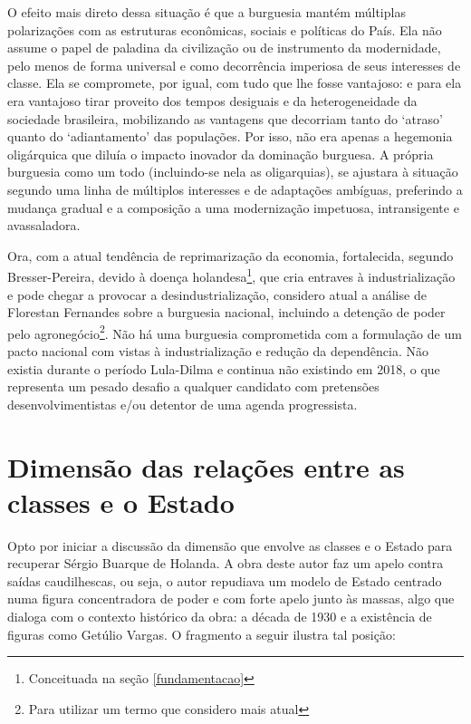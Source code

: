 	\begin{citacao}
		O efeito mais direto dessa situação é que a burguesia mantém múltiplas polarizações com as estruturas econômicas, sociais e políticas do País. Ela não assume o papel de paladina da civilização ou de instrumento da modernidade, pelo menos de forma universal e como decorrência imperiosa de seus interesses de classe. Ela se compromete, por igual, com tudo que lhe fosse vantajoso: e para ela era vantajoso tirar proveito dos tempos desiguais e da heterogeneidade da sociedade brasileira, mobilizando as vantagens que decorriam tanto do `atraso' quanto do `adiantamento' das populações. Por isso, não era apenas a hegemonia oligárquica que diluía o impacto inovador da dominação burguesa. A própria burguesia como um todo (incluindo-se nela as oligarquias), se ajustara à situação segundo uma linha de múltiplos interesses e de adaptações ambíguas, preferindo a mudança gradual e a composição a uma modernização impetuosa, intransigente e avassaladora. 
	\end{citacao}
	
	Ora, com a atual tendência de reprimarização da economia, fortalecida, segundo Bresser-Pereira, devido à doença holandesa\footnote{Conceituada na seção \ref{fundamentacao}}, que cria entraves à industrialização e pode chegar a provocar a desindustrialização, considero atual a análise de Florestan Fernandes sobre a burguesia nacional, incluindo a detenção de poder pelo agronegócio\footnote{Para utilizar um termo que considero mais atual}. Não há uma burguesia comprometida com a formulação de um pacto nacional com vistas à industrialização e redução da dependência. Não existia durante o período Lula-Dilma e continua não existindo em 2018, o que representa um pesado desafio a qualquer candidato com pretensões desenvolvimentistas e/ou detentor de uma agenda progressista.
	
	\section{Dimensão das relações entre as classes e o Estado} \label{dim_classes}
	
	Opto por iniciar a discussão da dimensão que envolve as classes e o Estado para recuperar Sérgio Buarque de Holanda. A obra deste autor faz um apelo contra saídas caudilhescas, ou seja, o autor repudiava um modelo de Estado centrado numa figura concentradora de poder e com forte apelo junto às massas, algo que dialoga com o contexto histórico da obra: a década de 1930 e a existência de figuras como Getúlio Vargas. O fragmento a seguir ilustra tal posição:
	
